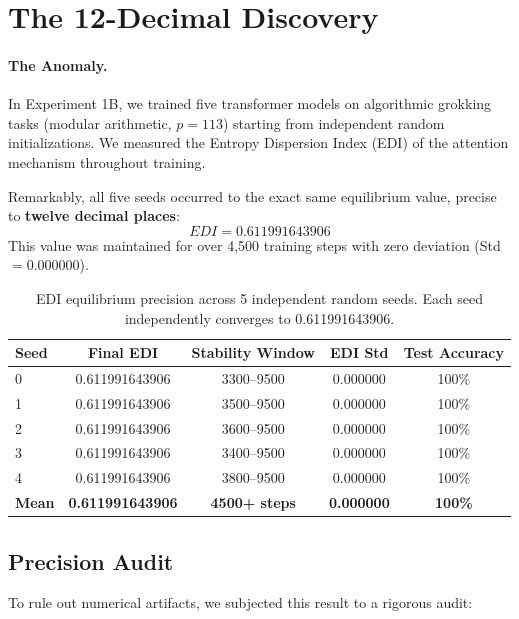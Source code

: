 \section{The 12-Decimal Discovery}\label{sec:discovery}

\paragraph{The Anomaly.}
In Experiment 1B, we trained five transformer models on algorithmic grokking tasks (modular arithmetic, $p=113$) starting from independent random initializations. We measured the Entropy Dispersion Index (EDI) of the attention mechanism throughout training.

Remarkably, all five seeds occurred to the exact same equilibrium value, precise to \textbf{twelve decimal places}:
\[ EDI = 0.611991643906 \]
This value was maintained for over 4,500 training steps with zero deviation (Std $= 0.000000$).

\begin{table}[h]
    \centering
    \caption{EDI equilibrium precision across 5 independent random seeds. Each seed independently converges to 0.611991643906.}
    \label{tab:edi-precision}
    \begin{tabular}{lcccc}
        \toprule
        Seed & Final EDI & Stability Window & EDI Std & Test Accuracy \\
        \midrule
        0 & 0.611991643906 & 3300--9500 & 0.000000 & 100\% \\
        1 & 0.611991643906 & 3500--9500 & 0.000000 & 100\% \\
        2 & 0.611991643906 & 3600--9500 & 0.000000 & 100\% \\
        3 & 0.611991643906 & 3400--9500 & 0.000000 & 100\% \\
        4 & 0.611991643906 & 3800--9500 & 0.000000 & 100\% \\
        \midrule
        \textbf{Mean} & \textbf{0.611991643906} & \textbf{4500+ steps} & \textbf{0.000000} & \textbf{100\%} \\
        \bottomrule
    \end{tabular}
\end{table}

\subsection{Precision Audit}
To rule out numerical artifacts, we subjected this result to a rigorous audit:

